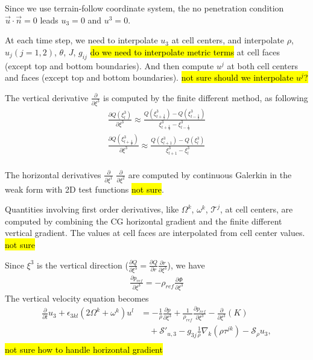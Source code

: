 \documentclass{report}
\begin{document}
Since we use terrain-follow coordinate system, the no penetration condition $\vec{u} \cdot \vec{n} = 0$ leads $u_3 = 0$ and $u^3 = 0$.

At each time step, we need to interpolate $u_3$ at cell centers, and interpolate  $\rho$, $u_j (j = 1,2)$, $\theta$, $J$, $g_{ij}$ \hl{do we need to interpolate metric terms} at cell faces (except top and bottom boundaries). And then compute $u^j$ at both cell centers and faces (except top and bottom boundaries). \hl{not sure should we interpolate $u^j$?}

The vertical derivative $\frac{\partial}{\partial\xi^3}$ is computed by the finite different method, as following
\begin{align*}
    \frac{\partial Q(\xi^3_{l})}{\partial\xi^3} \approx \frac{Q(\xi^3_{l+\frac{1}{2}}) - Q(\xi^3_{l-\frac{1}{2}})}{\xi^3_{l+\frac{1}{2}} - \xi^3_{l-\frac{1}{2}}}\\
    \frac{\partial Q(\xi^3_{l+\frac{1}{2}})}{\partial\xi^3} \approx \frac{Q(\xi^3_{l+1}) - Q(\xi^3_{l})}{\xi^3_{l+1} - \xi^3_{l}}\\
\end{align*}

The horizontal derivatives $\frac{\partial}{\partial\xi^1}$ $\frac{\partial}{\partial\xi^2}$ are computed by continuous Galerkin in the weak form  with 2D test functions \hl{not sure}.

Quantities involving first order derivatives, like $\Omega^k$, $\omega^k$, $\mathcal{T}^j$, at cell centers, are computed by combining the CG horizontal gradient and the finite different vertical gradient.  The values at cell faces are interpolated from cell center values. \hl{not sure}


Since $\xi^3$ is the vertical direction ($\frac{\partial Q}{\partial \xi^3} = \frac{\partial Q}{\partial r} \frac{\partial r}{\partial \xi^3}$), we have 
\begin{align*}
    \frac{\partial p_{ref}}{\partial \xi^3} = -\rho_{ref} \frac{\partial \Phi}{\partial \xi^3}
\end{align*}
The vertical velocity equation becomes 
\begin{align*}
    \frac{\partial}{\partial t} u_3 + \epsilon_{3kl} (2\Omega^k + \omega^k) u^l 
    &=  -\frac{1}{\rho} \frac{\partial p}{\partial\xi^3} 
    + \frac{1}{\rho_{ref}}\frac{\partial p_{ref}}{\partial\xi^3} 
   -  \frac{\partial}{\partial \xi^3} (K)  \nonumber\\
    & \quad + \mathcal{S}'_{u, 3} - g_{3j} \frac{1}{\rho} \nabla_k (\rho \tau^{jk}) - \mathcal{S}_\rho u_3,
    \label{e:equations_coord_hor_vert:velocity}\\
\end{align*}
\hl{not sure how to handle horizontal gradient}
\end{document}
